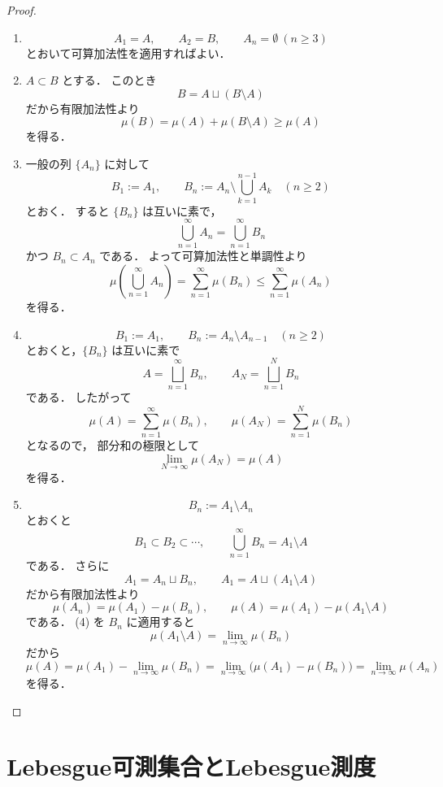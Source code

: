 \begin{proof}
\begin{enumerate}
    \item
    \[
    A_1=A,\qquad A_2=B,\qquad A_n=\emptyset\ (n\ge 3)
    \]
    とおいて可算加法性を適用すればよい．

    \item $A \subset B$ とする．
    このとき
    \[
    B=A \sqcup (B\setminus A)
    \]
    だから有限加法性より
    \[
    \mu(B)=\mu(A)+\mu(B\setminus A)\ge \mu(A)
    \]
    を得る．

    \item 一般の列 $\{A_n\}$ に対して
    \[
    B_1:=A_1,\qquad
    B_n:=A_n\setminus\bigcup_{k=1}^{n-1}A_k\quad(n\ge 2)
    \]
    とおく．
    すると $\{B_n\}$ は互いに素で，
    \[
    \bigcup_{n=1}^{\infty}A_n=\bigcup_{n=1}^{\infty}B_n
    \]
    かつ $B_n \subset A_n$ である．
    よって可算加法性と単調性より
    \[
    \mu\left(\bigcup_{n=1}^{\infty}A_n\right)
    =
    \sum_{n=1}^{\infty}\mu(B_n)
    \le
    \sum_{n=1}^{\infty}\mu(A_n)
    \]
    を得る．

    \item
    \[
    B_1:=A_1,\qquad B_n:=A_n\setminus A_{n-1}\quad(n\ge 2)
    \]
    とおくと，$\{B_n\}$ は互いに素で
    \[
    A=\bigsqcup_{n=1}^{\infty}B_n,\qquad
    A_N=\bigsqcup_{n=1}^{N}B_n
    \]
    である．
    したがって
    \[
    \mu(A)=\sum_{n=1}^{\infty}\mu(B_n),\qquad
    \mu(A_N)=\sum_{n=1}^{N}\mu(B_n)
    \]
    となるので，
    部分和の極限として
    \[
    \lim_{N\to\infty}\mu(A_N)=\mu(A)
    \]
    を得る．

    \item
    \[
    B_n:=A_1\setminus A_n
    \]
    とおくと
    \[
    B_1\subset B_2\subset \cdots,\qquad
    \bigcup_{n=1}^{\infty}B_n=A_1\setminus A
    \]
    である．
    さらに
    \[
    A_1=A_n\sqcup B_n,\qquad
    A_1=A\sqcup(A_1\setminus A)
    \]
    だから有限加法性より
    \[
    \mu(A_n)=\mu(A_1)-\mu(B_n),\qquad
    \mu(A)=\mu(A_1)-\mu(A_1\setminus A)
    \]
    である．
    (4) を $B_n$ に適用すると
    \[
    \mu(A_1\setminus A)=\lim_{n\to\infty}\mu(B_n)
    \]
    だから
    \[
    \mu(A)
    =
    \mu(A_1)-\lim_{n\to\infty}\mu(B_n)
    =
    \lim_{n\to\infty}\bigl(\mu(A_1)-\mu(B_n)\bigr)
    =
    \lim_{n\to\infty}\mu(A_n)
    \]
    を得る．
\end{enumerate}
\end{proof}

\section{Lebesgue可測集合とLebesgue測度}

